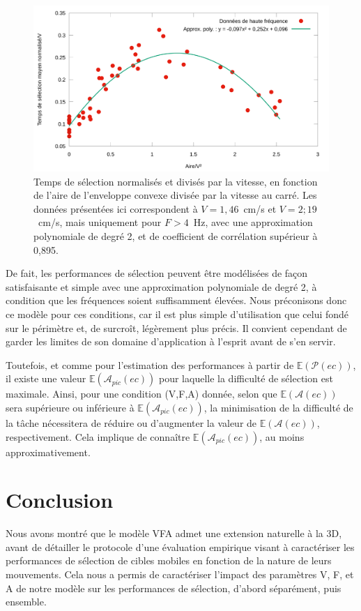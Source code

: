 	\begin{figure}[!htbp]
		\centering
		\includegraphics[width=\textwidth]{figures/ch4/perf_V_RealArea_better_fit}
		\caption[MTSN/V en fonction de l'aire/V² et approximation]{Temps de sélection normalisés et divisés par la vitesse, en fonction de l'aire de l'enveloppe convexe divisée par la vitesse au carré. Les données présentées ici correspondent à $V = 1,46$~cm/s et $V = 2;19$~cm/s, mais uniquement pour $F > 4$~Hz, avec une approximation polynomiale de degré 2, et de coefficient de corrélation supérieur à 0,895.}
		\label{fig:perf_V_RealArea_better_fit}
	\end{figure}
	
	De fait, les performances de sélection peuvent être modélisées de façon satisfaisante et simple avec une approximation polynomiale de degré 2, à condition que les fréquences soient suffisamment élevées. Nous préconisons donc ce modèle pour ces conditions, car il est plus simple d'utilisation que celui fondé sur le périmètre et, de surcroît, légèrement plus précis. Il convient cependant de garder les limites de son domaine d'application à l'esprit avant de s'en servir.
	
	Toutefois, et comme pour l'estimation des performances à partir de $\mathbb{E}(\mathcal{P}(ec))$, il existe une valeur $\mathbb{E}(\mathcal{A}_{pic}(ec))$ pour laquelle la difficulté de sélection est maximale. Ainsi, pour une condition (V,F,A) donnée, selon que $\mathbb{E}(\mathcal{A}(ec))$ sera supérieure ou inférieure à $\mathbb{E}(\mathcal{A}_{pic}(ec))$, la minimisation de la difficulté de la tâche nécessitera de réduire ou d'augmenter la valeur de $\mathbb{E}(\mathcal{A}(ec))$, respectivement. Cela implique de connaître $\mathbb{E}(\mathcal{A}_{pic}(ec))$, au moins approximativement.

\section{Conclusion}
	Nous avons montré que le modèle VFA admet une extension naturelle à la 3D, avant de détailler le protocole d'une évaluation empirique visant à caractériser les performances de sélection de cibles mobiles en fonction de la nature de leurs mouvements. Cela nous a permis de caractériser l'impact des paramètres V, F, et A de notre modèle sur les performances de sélection, d'abord séparément, puis ensemble.
	
